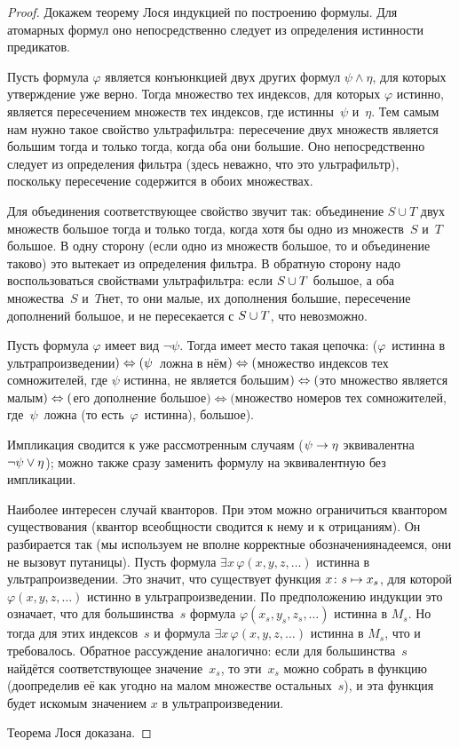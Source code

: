 \begin{proof}
Докажем  теорему Лося индукцией по построению формулы.
Для атомарных формул оно непосредственно следует из определения
истинности предикатов.

Пусть формула $\varphi$ является конъюнкцией двух других формул
$\psi\land\eta$, для которых утверждение уже верно. Тогда
множество тех индексов, для которых $\varphi$ истинно, является
пересечением множеств тех индексов, где истинны~$\psi$ и~$\eta$.
Тем самым нам нужно такое свойство ультрафильтра: пересечение
двух множеств является большим тогда и только тогда, когда оба
они большие. Оно непосредственно следует из определения фильтра
(здесь неважно, что это ультрафильтр), поскольку пересечение
содержится в обоих множествах.

Для объединения соответствующее свойство звучит так: объединение
$S\cup T$ двух множеств большое тогда и только тогда, когда хотя
бы одно из множеств~$S$ и~$T$ большое. В одну сторону (если одно
из множеств большое, то и объединение таково) это вытекает из
определения фильтра. В обратную сторону надо воспользоваться
свойствами ультрафильтра: если $S\hm\cup T$ большое, а оба
множества~$S$ и~$T$\т нет, то они малые, их дополнения большие,
пересечение дополнений большое, и не пересекается с $S\hm\cup
T$, что невозможно.

Пусть формула $\varphi$ имеет вид $\lnot\psi$. Тогда имеет место
такая цепочка: ($\varphi$~истинна в
ультрапроизведении$)\hm\Leftrightarrow(\psi$~ложна в
нём$)\hm\Leftrightarrow($множество индексов тех сомножителей,
где $\psi$ истинна, не является большим$)\hm\Leftrightarrow($это
множество является малым$)\hm\Leftrightarrow($его дополнение
большое$)\Leftrightarrow($мно\-жест\-во номеров тех сомножителей,
где~$\psi$~ложна (то есть~$\varphi$~истинна), большое).

Импликация сводится к уже рассмотренным случаям ($\psi\hm\to\eta$
эквивалентна $\lnot\psi\hm\lor\eta$); можно также сразу заменить
формулу на эквивалентную без импликации.

Наиболее интересен случай кванторов. При этом можно ограничиться
квантором существования (квантор всеобщности сводится к нему и к
отрицаниям). Он разбирается так (мы используем не вполне
корректные обозначения\т надеемся, они не вызовут путаницы).
Пусть формула
        $
\exists x\,\varphi(x,y,z,\dots)
        $
истинна в ультрапроизведении. Это значит, что существует функция
$x\colon s\hm\mapsto x_s$, для которой $\varphi(x,y,z,\dots)$
истинно в ультрапроизведении. По предположению индукции это означает,
что для большинства~$s$ формула $\varphi(x_s,y_s,z_s,\dots)$
истинна в $M_s$. Но тогда для этих индексов~$s$ и формула
        $
\exists x\,\varphi(x,y,z,\dots)
        $
истинна в $M_s$, что и требовалось. Обратное рассуждение
аналогично: если для большинства~$s$ найдётся
соответствующее значение~$x_s$, то эти~$x_s$ можно собрать в функцию
(доопределив её как угодно на малом множестве остальных~$s$), и
эта функция будет искомым значением $x$ в
ультрапроизведении.

Теорема Лося доказана.
\end{proof}

